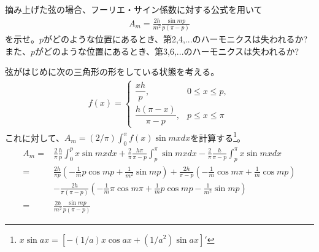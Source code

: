 \begin{renshu}
摘み上げた弦の場合、フーリエ・サイン係数に対する公式を用いて
\begin{align}
A_m=\frac{2h}{m^{2}}\frac{\sin mp}{p(\pi - p)}
\end{align}
を示せ。$p$がどのような位置にあるとき、第2,4,...のハーモニクスは失われるか?
また、$p$がどのような位置にあるとき、第3,6,...のハーモニクスは失われるか?
\end{renshu}

\begin{kaitou*}
弦がはじめに次の三角形の形をしている状態を考える。
\begin{align*}
f(x)=\left\{
\begin{array}{ll}
\dfrac{xh}{p}, & 0\le x\le p,\\
\dfrac{h(\pi-x)}{\pi-p}, & p\le x\le \pi
\end{array}
\right.
\end{align*}
これに対して、$A_{m}=(2/\pi)\int_{0}^{\pi}f(x)\sin mxdx$を計算する\footnote{$x\sin ax=[-(1/a)x\cos ax+(1/a^{2})\sin ax]'$}。
\begin{align*}
A_{m}=&\frac{2}{\pi}\frac{h}{p}\int_{0}^{p}x\sin mxdx+\frac{2}{\pi}\frac{h\pi}{\pi-p}\int_{p}^{\pi}\sin mxdx-\frac{2}{\pi}\frac{h}{\pi-p}\int_{p}^{\pi}x\sin mxdx\\
=&\frac{2h}{\pi p}\left(-\frac{1}{m}p\cos mp+\frac{1}{m^2}\sin mp\right)
+\frac{2h}{\pi-p}\left(-\frac{1}{m}\cos m\pi+\frac{1}{m}\cos mp\right)\\
&-\frac{2h}{\pi(\pi-p)}\left(-\frac{1}{m}\pi\cos m\pi+\frac{1}{m}p\cos mp-\frac{1}{m^2}\sin mp\right)\\
=&\frac{2h}{m^{2}}\frac{\sin mp}{p(\pi - p)}
\end{align*}
\end{kaitou*}